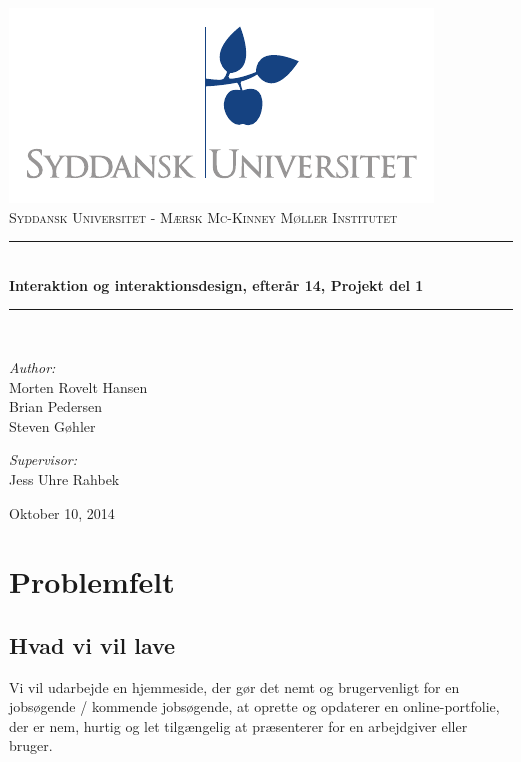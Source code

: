 \documentclass[a4paper,titlepage,fleqn,12pt]{article}
\begin{document}
\begin{titlepage}
	\begin{center}
	\includegraphics[scale=1.5,page=7]{sdu_logos.pdf}~\\[0.5cm]
	\textsc{\Large{Syddansk Universitet - Mærsk Mc-Kinney Møller Institutet}} \\[0.2cm]
	\rule{12cm}{1pt} \\[0.4cm]
	{ \huge \bfseries Interaktion og interaktionsdesign, efterår 14, Projekt del 1 \\[0.4cm] }
	\rule{12cm}{1pt} \\[1.5cm]
	
	\begin{minipage}{0.4\textwidth}
		\begin{flushleft} \large
			\textit{Author:}\\
			Morten Rovelt Hansen\\
			Brian Pedersen\\
			Steven Gøhler\\
		\end{flushleft}
	\end{minipage}
	\begin{minipage}{0.4\textwidth}
		\begin{flushright} \large
			\textit{Supervisor:} \\
			Jess Uhre Rahbek
		\end{flushright}
	\end{minipage}
	
	\vfill
	
	{\large Oktober 10, 2014}
	\end{center}
	\newpage
\end{titlepage}

\tableofcontents
\newpage

\section{Problemfelt}

\subsection{Hvad vi vil lave}
Vi vil udarbejde en hjemmeside, der gør det nemt og brugervenligt for en jobsøgende / kommende jobsøgende, at oprette og opdaterer en online-portfolie, der er nem, hurtig og let tilgængelig at præsenterer for en arbejdgiver eller bruger.
\end{document}
